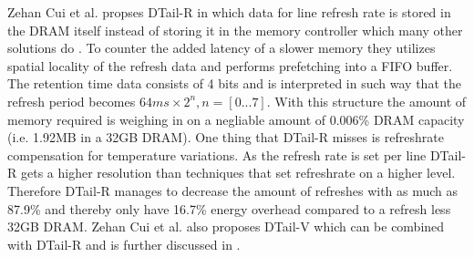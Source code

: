 Zehan Cui et al. \cite{dtail} propses DTail-R in which data for line refresh rate is stored in the DRAM itself instead of storing it in the memory controller which many other solutions do \cite{raidr}\cite{smartrefresh}\cite{refrint}. To counter the added latency of a slower memory they utilizes spatial locality of the refresh data and performs prefetching into a FIFO buffer. The retention time data consists of 4 bits and is interpreted in such way that the refresh period becomes \(64ms \times 2^n, n = [0...7]\). With this structure the amount of memory required is weighing in on a negliable amount of 0.006\% DRAM capacity (i.e. 1.92MB in a 32GB DRAM). One thing that DTail-R misses is refreshrate compensation for temperature variations. As the refresh rate is set per line DTail-R gets a higher resolution than techniques that set refreshrate on a higher level. Therefore DTail-R manages to decrease the amount of refreshes with as much as 87.9\% and thereby only have 16.7\% energy overhead compared to a refresh less 32GB DRAM. Zehan Cui et al. also proposes DTail-V \cite{dtail} which can be combined with DTail-R and is further discussed in .